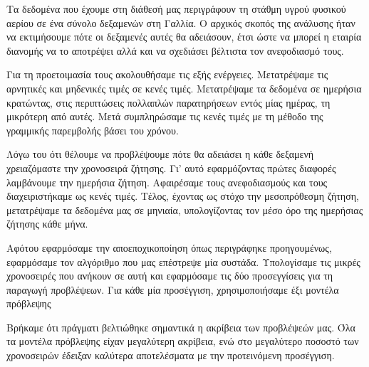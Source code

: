 Τα δεδομένα που έχουμε στη διάθεσή μας περιγράφουν τη στάθμη υγρού φυσικού αερίου σε ένα σύνολο δεξαμενών στη Γαλλία. Ο αρχικός σκοπός της ανάλυσης ήταν να εκτιμήσουμε πότε οι δεξαμενές αυτές θα αδειάσουν, έτσι ώστε να μπορεί η εταιρία διανομής να το αποτρέψει αλλά και να σχεδιάσει βέλτιστα τον ανεφοδιασμό τους. 

Για τη προετοιμασία τους ακολουθήσαμε τις εξής ενέργειες. Μετατρέψαμε τις αρνητικές και μηδενικές τιμές σε κενές τιμές. Μετατρέψαμε τα δεδομένα σε ημερήσια κρατώντας, στις περιπτώσεις πολλαπλών παρατηρήσεων εντός μίας ημέρας, τη μικρότερη από αυτές. Μετά συμπληρώσαμε τις κενές τιμές με τη μέθοδο της γραμμικής παρεμβολής βάσει του χρόνου.

Λόγω του ότι θέλουμε να προβλέψουμε πότε θα αδειάσει η κάθε δεξαμενή χρειαζόμαστε την χρονοσειρά ζήτησης. Γι' αυτό εφαρμόζοντας πρώτες διαφορές λαμβάνουμε την ημερήσια ζήτηση. Αφαιρέσαμε τους ανεφοδιασμούς και τους διαχειριστήκαμε ως κενές τιμές. Τέλος, έχοντας ως στόχο την μεσοπρόθεσμη ζήτηση, μετατρέψαμε τα δεδομένα μας σε μηνιαία, υπολογίζοντας τον μέσο όρο της ημερήσιας ζήτησης κάθε μήνα. 

Αφότου εφαρμόσαμε την αποεποχικοποίηση όπως περιγράφηκε προηγουμένως, εφαρμόσαμε τον αλγόριθμο  που μας επέστρεψε μία συστάδα. Υπολογίσαμε τις μικρές χρονοσειρές που ανήκουν σε αυτή και εφαρμόσαμε τις δύο προσεγγίσεις για τη παραγωγή προβλέψεων. Για κάθε μία προσέγγιση, χρησιμοποιήσαμε έξι μοντέλα πρόβλεψης

Βρήκαμε ότι πράγματι βελτιώθηκε σημαντικά η ακρίβεια των προβλέψεών μας. Όλα τα μοντέλα πρόβλεψης είχαν μεγαλύτερη ακρίβεια, ενώ στο μεγαλύτερο ποσοστό των χρονοσειρών έδειξαν καλύτερα αποτελέσματα με την προτεινόμενη προσέγγιση. 


